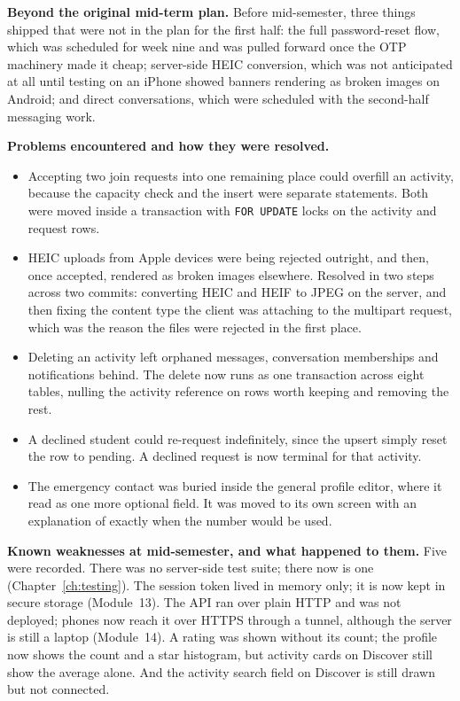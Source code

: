 \documentclass{tietreport}
\begin{document}
\medskip
\noindent\textbf{Beyond the original mid-term plan.} Before mid-semester, three things shipped that were not
in the plan for the first half: the full password-reset flow, which was scheduled for
week nine and was pulled forward once the OTP machinery made it cheap; server-side HEIC
conversion, which was not anticipated at all until testing on an iPhone showed banners
rendering as broken images on Android; and direct conversations, which were scheduled
with the second-half messaging work.

\medskip
\noindent\textbf{Problems encountered and how they were resolved.}

\begin{itemize}
  \item Accepting two join requests into one remaining place could overfill an activity,
        because the capacity check and the insert were separate statements. Both were
        moved inside a transaction with \texttt{FOR UPDATE} locks on the activity and
        request rows.

  \item HEIC uploads from Apple devices were being rejected outright, and then, once
        accepted, rendered as broken images elsewhere. Resolved in two steps across two
        commits: converting HEIC and HEIF to JPEG on the server, and then fixing the
        content type the client was attaching to the multipart request, which was the
        reason the files were rejected in the first place.

  \item Deleting an activity left orphaned messages, conversation memberships and
        notifications behind. The delete now runs as one transaction across eight tables,
        nulling the activity reference on rows worth keeping and removing the rest.

  \item A declined student could re-request indefinitely, since the upsert simply reset
        the row to pending. A declined request is now terminal for that activity.

  \item The emergency contact was buried inside the general profile editor, where it read
        as one more optional field. It was moved to its own screen with an explanation of
        exactly when the number would be used.
\end{itemize}

\medskip
\noindent\textbf{Known weaknesses at mid-semester, and what happened to them.} Five were
recorded. There was no server-side test suite; there now is one (Chapter~\ref{ch:testing}).
The session token lived in memory only; it is now kept in secure storage (Module~13). The
API ran over plain HTTP and was not deployed; phones now reach it over HTTPS through a
tunnel, although the server is still a laptop (Module~14). A rating was shown without its
count; the profile now shows the count and a star histogram, but activity cards on Discover
still show the average alone. And the activity search field on Discover is still drawn but
not connected.
\end{document}
